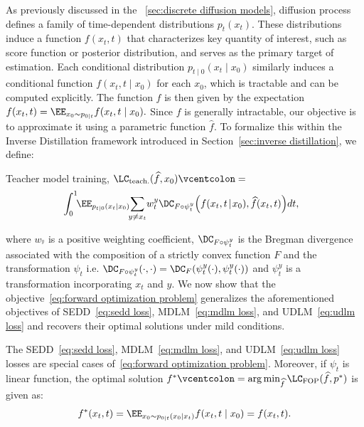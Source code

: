     As previously discussed in the \wasyparagraph~\ref{sec:discrete diffusion models}, diffusion process defines a family of time-dependent distributions $p_t(x_t)$. These distributions induce a function $f(x_t, t)$ that characterizes key quantity of interest, such as score function or posterior distribution, and serves as the primary target of estimation. Each conditional distribution $p_{t \mid 0}(x_t \mid x_0)$ similarly induces a conditional function $f(x_t, t \mid x_0)$ for each $x_0$, which is tractable and can be computed explicitly. The function $f$ is then given by the expectation $f(x_t, t) = \EE_{x_0 \sim p_{0 \mid t}} f(x_t, t \mid x_0).$ Since $f$ is generally intractable, our objective is to approximate it using a parametric function $\widehat{f}$. To formalize this within the Inverse Distillation framework introduced in Section~\ref{sec:inverse distillation}, we define:
    \begin{Box1}{Teacher model training, $\LC_{\text{teach.}}(\widehat{f}, x_0) \vcentcolon=$}
    \vspace{-8pt}
    \begin{align}
      \label{eq:forward optimization problem}
      \!\!\!\! \int_0^1 \!\! \EE_{p_{t|0}(x_t|x_0)} \!\! \sum_{y \neq x_t}\!  w_t^y 
      \DC_{F\circ\psi_t^y}\!\left(f(x_t, t \!\mid\! x_0), \widehat{f}(x_t, t)\right) \!dt,
    \end{align}
    \end{Box1}
    where $w_^y$ is a positive weighting coefficient, $\DC_{F\circ\psi_t^y}$ is the Bregman divergence associated with the composition of a strictly convex function $F$ and the transformation $\psi_t$ i.e. $\DC_{F\circ\psi_t^y}(\cdot,\cdot) = \DC_{F}(\psi_t^y(\cdot), \psi_t^y(\cdot))$ and $\psi_t^y$ is a transformation incorporating $x_t$ and $y$.
    We now show that the objective~\eqref{eq:forward optimization problem} generalizes the aforementioned objectives of SEDD~\eqref{eq:sedd loss}, MDLM~\eqref{eq:mdlm loss}, and UDLM~\eqref{eq:udlm loss} and recovers their optimal solutions under mild conditions.
    \begin{proposition}
    \label{prop:optimum of universal loss}
    The SEDD~\eqref{eq:sedd loss}, MDLM~\eqref{eq:mdlm loss}, and UDLM~\eqref{eq:udlm loss} losses are special cases of~\eqref{eq:forward optimization problem}. Moreover, if $\psi_t$ is linear function, the optimal solution $f^* \vcentcolon= \arg\min_{\widehat{f}} \LC_{\text{FOP}}(\widehat{f}, p^*)$ is given as:
    \begin{gather}
      f^*(x_t, t) = \EE_{x_0 \sim p_{0\mid t}(x_0 \mid x_t)} f(x_t, t \mid x_0) = f(x_t, t). \nonumber
    \end{gather}
    \end{proposition}
